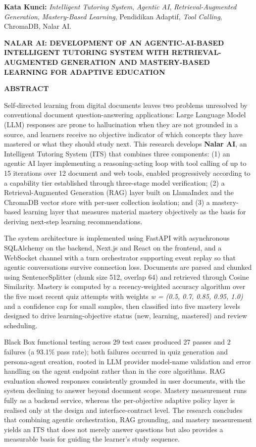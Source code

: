 \documentclass[12pt,a4paper]{article}
\begin{document}
\textbf{Kata Kunci:} \textit{Intelligent Tutoring System}, \textit{Agentic AI}, \textit{Retrieval-Augmented Generation}, \textit{Mastery-Based Learning}, Pendidikan Adaptif, \textit{Tool Calling}, ChromaDB, Nalar AI.

\newpage
\textbf{NALAR AI: DEVELOPMENT OF AN AGENTIC-AI-BASED INTELLIGENT TUTORING SYSTEM WITH RETRIEVAL-AUGMENTED GENERATION AND MASTERY-BASED LEARNING FOR ADAPTIVE EDUCATION}

\textbf{ABSTRACT}

Self-directed learning from digital documents leaves two problems unresolved by conventional document question-answering applications: Large Language Model (LLM) responses are prone to hallucination when they are not grounded in a source, and learners receive no objective indicator of which concepts they have mastered or what they should study next. This research develops \textbf{Nalar AI}, an Intelligent Tutoring System (ITS) that combines three components: (1) an agentic AI layer implementing a reasoning-acting loop with tool calling of up to 15 iterations over 12 document and web tools, enabled progressively according to a capability tier established through three-stage model verification; (2) a Retrieval-Augmented Generation (RAG) layer built on LlamaIndex and the ChromaDB vector store with per-user collection isolation; and (3) a mastery-based learning layer that measures material mastery objectively as the basis for deriving next-step learning recommendations.

The system architecture is implemented using FastAPI with asynchronous SQLAlchemy on the backend, Next.js and React on the frontend, and a WebSocket channel with a turn orchestrator supporting event replay so that agentic conversations survive connection loss. Documents are parsed and chunked using SentenceSplitter (chunk size 512, overlap 64) and retrieved through Cosine Similarity. Mastery is computed by a recency-weighted accuracy algorithm over the five most recent quiz attempts with weights \textit{w = (0.5, 0.7, 0.85, 0.95, 1.0)} and a confidence cap for small samples, then classified into five mastery levels designed to drive learning-objective status (new, learning, mastered) and review scheduling.

Black Box functional testing across 29 test cases produced 27 passes and 2 failures (a 93.1\% pass rate); both failures occurred in quiz generation and persona-agent creation, rooted in LLM provider model-name validation and error handling on the agent endpoint rather than in the core algorithms. RAG evaluation showed responses consistently grounded in user documents, with the system declining to answer beyond document scope. Mastery measurement runs fully as a backend service, whereas the per-objective adaptive policy layer is realised only at the design and interface-contract level. The research concludes that combining agentic orchestration, RAG grounding, and mastery measurement yields an ITS that does not merely answer questions but also provides a measurable basis for guiding the learner's study sequence.
\end{document}
